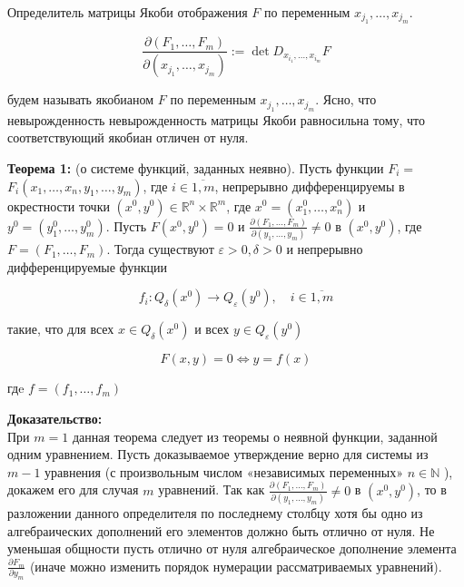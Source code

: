 \documentclass[a4paper,12pt]{article} %
\begin{document}
Определитель матрицы Якоби отображения $F$ по переменным $x_{j_{1}}, \ldots, x_{j_{m}}$.

$$
\frac{\partial\left(F_{1}, \ldots, F_{m}\right)}{\partial\left(x_{j_{1}}, \ldots, x_{j_{m}}\right)}:=\operatorname{det} D_{x_{i_{1}}, \ldots, x_{i_{m}}} F
$$

будем называть якобианом $F$ по переменным $x_{j_{1}}, \ldots, x_{j_{m}}$. Ясно, что невырожденность невырожденность матрицы Якоби равносильна тому, что соответствующий якобиан отличен от нуля.

\textbf{Теорема 1:} (о системе функций, заданных неявно). Пусть функции $F_{i}=$ $F_{i}\left(x_{1}, \ldots, x_{n}, y_{1}, \ldots, y_{m}\right)$, где $i \in \overline{1, m}$, непрерывно дифференцируемы в окрестности точки $\left(x^{0}, y^{0}\right) \in \mathbb{R}^{n} \times \mathbb{R}^{m}$, где $x^{0}=\left(x_{1}^{0}, \ldots, x_{n}^{0}\right)$ и $y^{0}=\left(y_{1}^{0}, \ldots, y_{m}^{0}\right)$. Пусть $F\left(x^{0}, y^{0}\right)=0$ и $\frac{\partial\left(F_{1}, \ldots, F_{m}\right)}{\partial\left(y_{1}, \ldots, y_{m}\right)} \neq 0$ в $\left(x^{0}, y^{0}\right)$, где $F=\left(F_{1}, \ldots, F_{m}\right)$. Тогда существуют $\varepsilon>0, \delta>0$ и непрерывно дифференцируемые функции

$$
f_{i}: Q_{\delta}\left(x^{0}\right) \rightarrow Q_{\varepsilon}\left(y^{0}\right), \quad i \in \overline{1, m}
$$

такие, что для всех $x \in Q_{\delta}\left(x^{0}\right)$ и всех $y \in Q_{\varepsilon}\left(y^{0}\right)$

$$
F(x, y)=0 \Leftrightarrow y=f(x)
$$

гдe $f=\left(f_{1}, \ldots, f_{m}\right)$

\textbf{Доказательство:}\\
При $m=1$ данная теорема следует из теоремы о неявной функции, заданной одним уравнением. Пусть доказываемое утверждение верно для системы из $m-1$ уравнения (с произвольным числом «независимых переменных» $n \in \mathbb{N}$ ), докажем его для случая $m$ уравнений. Так как $\frac{\partial\left(F_{1}, \ldots, F_{m}\right)}{\partial\left(y_{1}, \ldots, y_{m}\right)} \neq 0$ в $\left(x^{0}, y^{0}\right)$, то в разложении данного определителя по последнему столбцу хотя бы одно из алгебраических дополнений его элементов должно быть отлично от нуля. Не уменьшая общности пусть отлично от нуля алгебраическое дополнение элемента $\frac{\partial F_{m}}{\partial y_{m}}$ (иначе можно изменить порядок нумерации рассматриваемых уравнений).
\end{document}
